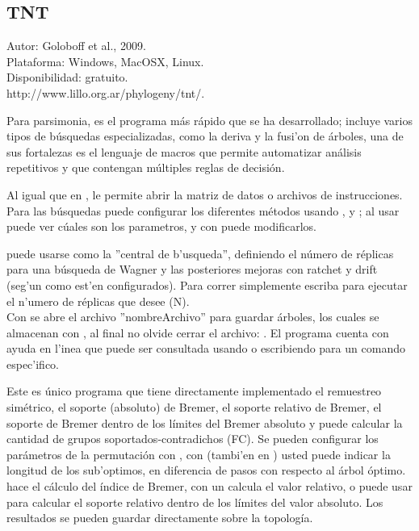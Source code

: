 \subsection{TNT}
\noindent
Autor: Goloboff et al., 2009.\\ %
Plataforma: Windows, MacOSX, Linux.\\
Disponibilidad: gratuito.\\
http://www.lillo.org.ar/phylogeny/tnt/.


Para parsimonia, es el programa m\'as r\'apido que se ha desarrollado; incluye varios tipos de b\'usquedas especializadas, como la deriva y la fusi'on de \'arboles, una de sus fortalezas es el lenguaje de macros que permite automatizar an\'alisis repetitivos y que contengan m\'ultiples reglas de decisi\'on.


Al igual que en ,  le permite abrir la matriz de datos o archivos de instrucciones. Para las b\'usquedas puede configurar los diferentes m\'etodos usando ,  y ; al usar  puede ver c\'uales son los parametros, y con \cmd{=} puede modificarlos.

 puede usarse como la ''central de b'usqueda'', definiendo el n\'umero de r\'eplicas para una b\'usqueda de Wagner y las posteriores mejoras con ratchet y drift (seg'un como est'en configurados). Para correr simplemente escriba  para ejecutar el n'umero de r\'eplicas que desee (N).\\
Con  se abre el archivo ''nombreArchivo'' para guardar \'arboles, los cuales se almacenan con , al final no olvide cerrar el archivo: .
El programa cuenta con ayuda en l'inea que puede ser consultada usando  o escribiendo  para un comando espec'ifico.

Este es \'unico programa que tiene directamente implementado el remuestreo sim\'etrico, el soporte (absoluto) de Bremer, el soporte relativo de Bremer, el soporte de Bremer dentro de los l\'imites del Bremer absoluto y puede calcular la cantidad de grupos soportados-contradichos (FC). Se pueden configurar los par\'ametros de la permutaci\'on con , con  (tambi'en en ) usted puede indicar la longitud de los sub'optimos, en diferencia de pasos con respecto al \'arbol \'optimo.  hace el c\'alculo del \'indice de Bremer, con un \cmd{*} calcula el valor relativo, o puede usar \cmd{Bsupport ]} para calcular el soporte relativo dentro de los l\'imites del valor absoluto. Los resultados se pueden guardar directamente sobre la topolog\'ia.\\
